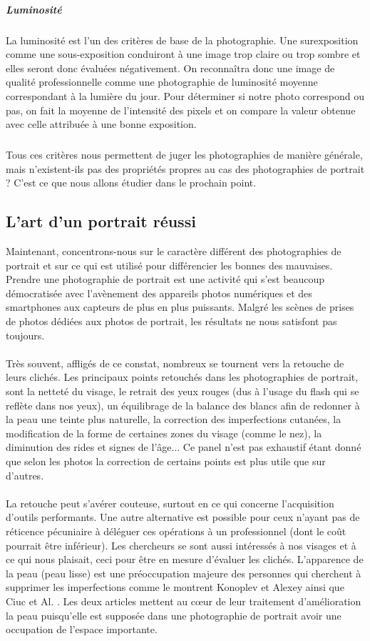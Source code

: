 \documentclass[11pt, french]{report-rd-info}
\begin{document}
\subparagraph{Luminosité}
La luminosité est l’un des critères de base de la photographie. Une surexposition  comme une sous-exposition conduiront à une image trop claire ou trop sombre et elles seront donc évaluées négativement. On reconnaîtra donc une image de qualité professionnelle comme une photographie de luminosité moyenne correspondant à la lumière du jour. Pour déterminer si notre photo correspond ou pas, on fait la moyenne de l’intensité des pixels et on compare la valeur obtenue avec celle attribuée à une bonne exposition.
\subparagraph{}
Tous ces critères nous permettent de juger les photographies de manière générale, mais n'existent-ils pas des propriétés propres au cas des photographies de portrait ? C'est ce que nous allons étudier dans le prochain point.





\subsection{L’art d’un portrait réussi}
Maintenant, concentrons-nous sur le caractère différent des photographies de portrait et sur ce qui est utilisé pour différencier les bonnes des mauvaises.
Prendre une photographie de portrait est une activité qui s'est beaucoup démocratisée avec l'avènement des appareils photos numériques et des smartphones aux capteurs de plus en plus puissants. Malgré les scènes de prises de photos dédiées aux photos de portrait, les résultats ne nous satisfont pas toujours.
\paragraph*{}
Très souvent, affligés de ce constat, nombreux se tournent vers la retouche de leurs clichés. Les principaux points retouchés dans les photographies de portrait, sont la netteté du visage, le retrait des yeux rouges (dus à l'usage du flash qui se reflète dans nos yeux), un équilibrage de la balance des blancs afin de redonner à la peau une teinte plus naturelle, la correction des imperfections cutanées, la modification de la forme de certaines zones du visage (comme le nez), la diminution des rides et signes de l'âge... Ce panel n'est pas exhaustif étant donné que selon les photos la correction de certains points est plus utile que sur d'autres.
\paragraph*{}
La retouche peut s'avérer couteuse, surtout en ce qui concerne l'acquisition d'outils performants. Une autre alternative est possible pour ceux n'ayant pas de réticence pécuniaire à déléguer ces opérations à un professionnel (dont le coût pourrait être inférieur). Les chercheurs se sont aussi intéressés à nos visages et à ce qui nous plaisait, ceci pour être en mesure d'évaluer les clichés. L’apparence de la peau (peau lisse) est une préoccupation majeure des personnes qui cherchent à supprimer les imperfections comme le montrent Konoplev et Alexey \cite{Konoplev2012} ainsi que Ciuc et Al. \cite{Ciuc2010}. Les deux articles mettent au cœur de leur traitement d'amélioration la peau puisqu'elle est supposée dans une photographie de portrait avoir une occupation de l'espace importante.
\end{document}
